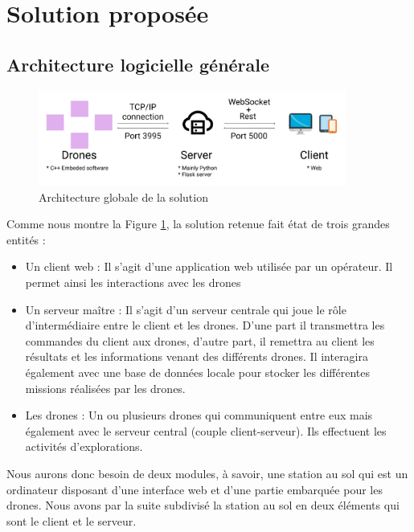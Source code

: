\documentclass{mistcoursedoc}
\begin{document}
\section{Solution proposée}

\subsection{Architecture logicielle générale}

\begin{figure}[h!]
  \centering\includegraphics[width=0.9\textwidth]{architecture-globale.png}
  \caption{Architecture globale de la solution}
  \label{fig:arch}
\end{figure}

\par Comme nous montre la Figure \ref{fig:arch}, la solution retenue fait état de trois grandes entités :
\begin{itemize}
  \item Un client web : Il s'agit d’une application web utilisée par un opérateur. Il permet ainsi les interactions avec les drones
  \item Un serveur maître : Il s’agit d’un serveur centrale qui joue le rôle d'intermédiaire entre le client et les drones. D’une part il transmettra les commandes du client aux drones, d'autre part, il remettra au client les résultats et les informations venant des différents drones. Il interagira également avec une base de données locale pour stocker les différentes missions réalisées par les drones.
  \item Les drones : Un ou plusieurs drones qui communiquent entre eux mais également avec le serveur central (couple client-serveur). Ils effectuent les activités d'explorations.
\end{itemize}

\par Nous aurons donc besoin de deux modules, à savoir, une station au sol qui est un ordinateur disposant d’une interface web et d’une partie embarquée pour les drones. Nous avons par la suite subdivisé la station au sol en deux éléments qui sont le client et le serveur.
\end{document}
